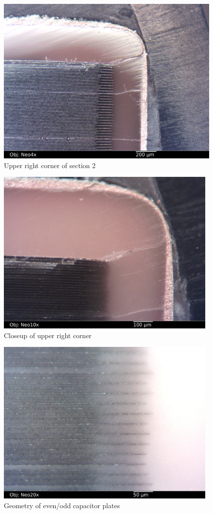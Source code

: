 \documentclass{article}
\begin{document}
\begin{figure}[h]
\includegraphics[width=14cm,keepaspectratio]{section2_02_df_neo4x_annotated.jpg}
\caption{Upper right corner of section 2}
\label{section2_1}
\end{figure}

\begin{figure}[h]
\includegraphics[width=11cm,keepaspectratio]{section2_03_df_neo10x_annotated.jpg}
\caption{Closeup of upper right corner}
\label{section2_2}
\end{figure}

\begin{figure}[h]
\includegraphics[width=11cm,keepaspectratio]{section2_05_df_neo20x_annotated.jpg}
\caption{Geometry of even/odd capacitor plates}
\label{plate-geometry}
\end{figure}
\end{document}
